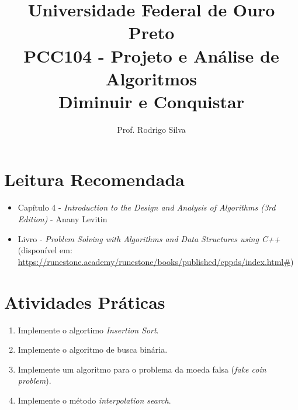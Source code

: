 \documentclass{article}
\title{\vspace{-2 cm}Universidade Federal de Ouro Preto \\ PCC104 - Projeto e Análise de Algoritmos \\ Diminuir e Conquistar}
\author{Prof. Rodrigo Silva}
\begin{document}
\maketitle

\section{Leitura Recomendada}

\begin{itemize}
    \item Capítulo 4 - \textit{Introduction to the Design and Analysis of Algorithms (3rd Edition)} - Anany Levitin 
    \item Livro - \textit{Problem Solving with Algorithms and Data Structures using C++} (disponível em: \url{https://runestone.academy/runestone/books/published/cppds/index.html#})
\end{itemize}

\section{Atividades Práticas}

\begin{enumerate}
    \item Implemente o algortimo \textit{Insertion Sort}.
    \item Implemente o algoritmo de busca binária.
    \item Implemente um algoritmo para o problema da moeda falsa (\textit{fake coin problem}).
    \item Implemente o método \textit{interpolation search}.
\end{enumerate}
\end{document}
